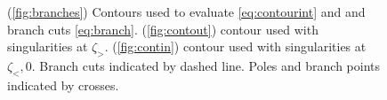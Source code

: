 \documentclass[12pt]{article}
\begin{document}
\begin{figure}
 \begin{center}
 \begin{myenuma}
  \item{}\label{fig:branches}
  \hspace{0.5cm}
  \item{}\label{fig:contout}
  \hspace{0.5cm}
  \item{}\label{fig:contin}
 \end{myenuma}
 \end{center}
  \caption{(\ref{fig:branches}) Contours used to evaluate \eqref{eq:contourint} and and branch cuts \eqref{eq:branch}.
  (\ref{fig:contout}) contour used with singularities at $\zeta_>$.
  (\ref{fig:contin}) contour used with singularities at $\zeta_<,0$.
  Branch cuts indicated by dashed line.
  Poles and branch points indicated by crosses.}\label{fig:contours}
\end{figure}
\end{document}
